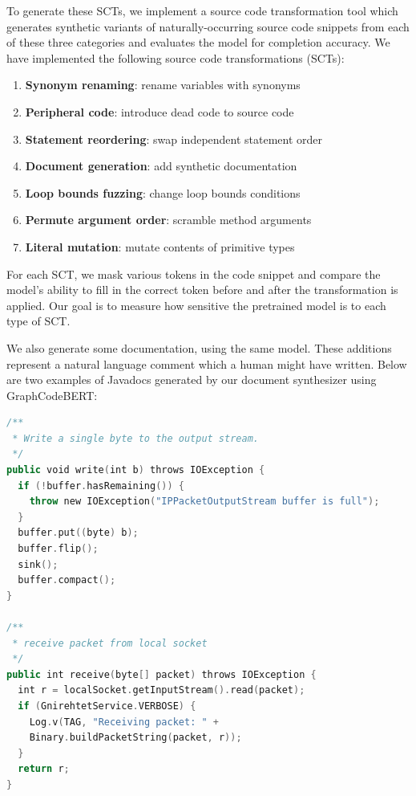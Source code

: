 \documentclass[sigconf,review,anonymous]{acmart}
\begin{document}
  To generate these SCTs, we implement a source code transformation tool which generates synthetic variants of naturally-occurring source code snippets from each of these three categories and evaluates the model for completion accuracy. We have implemented the following source code transformations (SCTs):

  \begin{enumerate}
    \item \textbf{Synonym renaming}: rename variables with synonyms
    \item \textbf{Peripheral code}: introduce dead code to source code
    \item \textbf{Statement reordering}: swap independent statement order
    \item \textbf{Document generation}: add synthetic documentation
    \item \textbf{Loop bounds fuzzing}: change loop bounds conditions
    \item \textbf{Permute argument order}: scramble method arguments
    \item \textbf{Literal mutation}: mutate contents of primitive types
  \end{enumerate}

  For each SCT, we mask various tokens in the code snippet and compare the model's ability to fill in the correct token before and after the transformation is applied. Our goal is to measure how sensitive the pretrained model is to each type of SCT.

  We also generate some documentation, using the same model. These additions represent a natural language comment which a human might have written. Below are two examples of Javadocs generated by our document synthesizer using GraphCodeBERT:


  \begin{lstlisting}[basicstyle=\scriptsize\ttfamily, language=kotlin,label={lst:lstlisting}]
/**
 * Write a single byte to the output stream.
 */
public void write(int b) throws IOException {
  if (!buffer.hasRemaining()) {
    throw new IOException("IPPacketOutputStream buffer is full");
  }
  buffer.put((byte) b);
  buffer.flip();
  sink();
  buffer.compact();
}

/**
 * receive packet from local socket
 */
public int receive(byte[] packet) throws IOException {
  int r = localSocket.getInputStream().read(packet);
  if (GnirehtetService.VERBOSE) {
    Log.v(TAG, "Receiving packet: " +
    Binary.buildPacketString(packet, r));
  }
  return r;
}
  \end{lstlisting}
\end{document}
